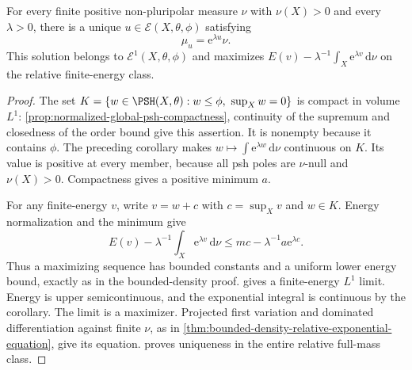 \begin{theorem}\label{thm:nonpluripolar-relative-exponential-equation}
For every finite positive non-pluripolar measure $\nu$ with $\nu(X)>0$ and every $\lambda>0$, there is a unique
$u\in\mathcal E(X,\theta,\phi)$ satisfying
\[
 \mu_u=\mathrm e^{\lambda u}\nu.
\]
This solution belongs to $\mathcal E^1(X,\theta,\phi)$ and maximizes
$E(v)-\lambda^{-1}\int_X\mathrm e^{\lambda v}\,\mathrm d\nu$
on the relative finite-energy class.
\end{theorem}
\begin{proof}
The set
$K=\{w\in\PSH(X,\theta):w\leq\phi,\ \sup_Xw=0\}$
is compact in volume $L^1$: \cref{prop:normalized-global-psh-compactness}, continuity of the supremum and closedness of the order bound give this assertion. It is nonempty because it contains $\phi$. The preceding corollary makes $w\mapsto\int\mathrm e^{\lambda w}\,\mathrm d\nu$ continuous on $K$. Its value is positive at every member, because all psh poles are $\nu$-null and $\nu(X)>0$. Compactness gives a positive minimum $a$.

For any finite-energy $v$, write $v=w+c$ with $c=\sup_Xv$ and $w\in K$. Energy normalization and the minimum give
\[
 E(v)-\lambda^{-1}\int_X\mathrm e^{\lambda v}\,\mathrm d\nu
                       \leq mc-\lambda^{-1}a\mathrm e^{\lambda c}.
\]
Thus a maximizing sequence has bounded constants and a uniform lower energy bound, exactly as in the bounded-density proof.  gives a finite-energy $L^1$ limit. Energy is upper semicontinuous, and the exponential integral is continuous by the corollary. The limit is a maximizer. Projected first variation and dominated differentiation against finite $\nu$, as in \cref{thm:bounded-density-relative-exponential-equation}, give its equation.  proves uniqueness in the entire relative full-mass class.
\end{proof}

